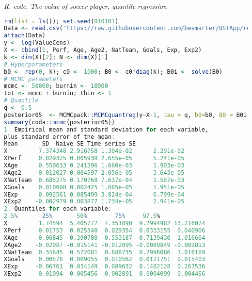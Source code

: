 \begin{tcolorbox}[enhanced,width=4.67in,center upper,
	fontupper=\large\bfseries,drop shadow southwest,sharp corners]
	\textit{R. code. The value of soccer player, quantile regression}
	\begin{VF}
		\begin{lstlisting}[language=R]
rm(list = ls()); set.seed(010101)
Data <- read.csv("https://raw.githubusercontent.com/besmarter/BSTApp/refs/heads/master/DataApp/1ValueFootballPlayers.csv", sep = ",", header = TRUE, quote = "")
attach(Data)
y <- log(ValueCens) 
X <- cbind(1, Perf, Age, Age2, NatTeam, Goals, Exp, Exp2)
k <- dim(X)[2]; N <- dim(X)[1]
# Hyperparameters
b0 <- rep(0, k); c0 <- 1000; B0 <- c0*diag(k); B0i <- solve(B0)
# MCMC parameters
mcmc <- 50000; burnin <- 10000
tot <- mcmc + burnin; thin <- 1
# Quantile
q <- 0.5
posterior05  <- MCMCpack::MCMCquantreg(y~X-1, tau = q, b0=b0, B0 = B0i, burnin = burnin, mcmc = mcmc, thin = thin, below = 13.82, above = Inf)
summary(coda::mcmc(posterior05))
1. Empirical mean and standard deviation for each variable,
plus standard error of the mean:
Mean       SD  Naive SE Time-series SE
X         7.374348 2.916758 1.304e-02      2.291e-02
XPerf     0.029325 0.005938 2.655e-05      5.241e-05
XAge      0.550633 0.241596 1.080e-03      1.903e-03
XAge2    -0.012027 0.004597 2.056e-05      3.643e-05
XNatTeam  0.685275 0.170768 7.637e-04      1.587e-03
XGoals    0.010608 0.002425 1.085e-05      1.951e-05
XExp      0.092561 0.085499 3.824e-04      6.799e-04
XExp2    -0.002979 0.003877 1.734e-05      2.941e-05
2. Quantiles for each variable:
2.5%       25%       50%        75%     97.5%
X         1.74594  5.405772  7.351090  9.2994982 13.216024
XPerf     0.01753  0.025340  0.029354  0.0333155  0.040906
XAge      0.06845  0.390780  0.553187  0.7139430  1.016664
XAge2    -0.02087 -0.015141 -0.012095 -0.0089849 -0.002813
XNatTeam  0.34645  0.572081  0.686735  0.7996086  1.016189
XGoals    0.00578  0.009055  0.010562  0.0121751  0.015403
XExp     -0.06761  0.034149  0.089632  0.1482128  0.267536
XExp2    -0.01094 -0.005456 -0.002891 -0.0004099  0.004466
\end{lstlisting}
	\end{VF}
\end{tcolorbox} 

